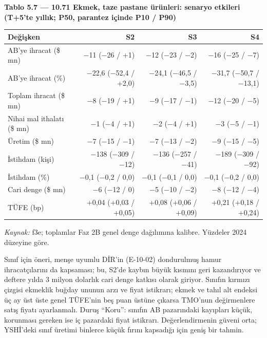 
\textbf{Tablo 5.7 --- 10.71 Ekmek, taze pastane ürünleri: senaryo etkileri (T+5'te yıllık; P50, parantez içinde P10 / P90)}

\nopagebreak[4]

\begingroup\gbtablo\small

\begin{longtable}[]{@{}lrrr@{}}
\toprule\noalign{}
\textbf{Değişken} & \textbf{S2} & \textbf{S3} & \textbf{S4} \\
\midrule\noalign{}
\endhead
\bottomrule\noalign{}
\endlastfoot
AB'ye ihracat (\$ mn) & −11 (−26 / +1) & −12 (−23 / −2) & −16 (−25 / −7) \\
AB'ye ihracat (\%) & −22,6 (−52,4 / +2,0) & −24,1 (−46,5 / −3,5) & −31,7 (−50,7 / −13,1) \\
Toplam ihracat (\$ mn) & −8 (−19 / +1) & −9 (−17 / −1) & −12 (−20 / −5) \\
Nihai mal ithalatı (\$ mn) & −1 (−4 / +1) & −2 (−4 / +1) & −3 (−5 / −1) \\
Üretim (\$ mn) & −7 (−15 / −1) & −7 (−13 / −2) & −9 (−15 / −5) \\
İstihdam (kişi) & −138 (−309 / −12) & −136 (−257 / −41) & −189 (−309 / −92) \\
İstihdam (\%) & −0,1 (−0,2 / 0,0) & −0,1 (−0,1 / 0,0) & −0,1 (−0,2 / 0,0) \\
Cari denge (\$ mn) & −6 (−12 / 0) & −5 (−10 / −2) & −8 (−12 / −4) \\
TÜFE (bp) & +0,04 (+0,03 / +0,05) & +0,08 (+0,06 / +0,09) & +0,21 (+0,18 / +0,24) \\
\end{longtable}

\endgroup

\emph{Kaynak:} \etiketT{} f3e; toplamlar Faz 2B genel denge dağılımına kalibre. Yüzdeler 2024 düzeyine göre.

Sınıf için öneri, menşe uyumlu DİR'in (E-10-02) dondurulmuş hamur ihracatçılarını da kapsaması; bu, S2'de kaybın büyük kısmını geri kazandırıyor ve deftere yılda 3 milyon dolarlık cari denge katkısı olarak giriyor. Sınıfın kırmızı çizgisi ekmeklik buğday ununun arzı ve fiyat istikrarı; ekmek ve tahıl alt endeksi üç ay üst üste genel TÜFE'nin beş puan üstüne çıkarsa TMO'nun değirmenlere satış fiyatı ayarlanmalı. Duruş ``Koru'': sınıfın AB pazarındaki kayıpları küçük, korunması gereken ise iç pazardaki fiyat istikrarı. Değerlendirmenin güveni orta; YSHİ'deki sınıf üretimi binlerce küçük fırını kapsadığı için geniş bir tahmin.

